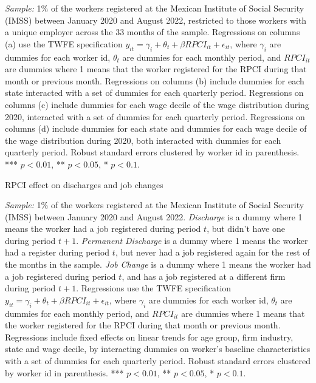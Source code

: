 \documentclass[oneside,11pt]{article}
\begin{document}
\scriptsize{
\noindent \textit{Sample:} 1\% of the workers registered at the Mexican Institute of Social Security (IMSS) between January 2020 and August 2022, restricted to those workers with a unique employer across the 33 months of the sample. Regressions on columns (a) use the TWFE specification $y_{it} = \gamma_{i} + \theta_{t}+ \beta RPCI_{it} +\epsilon_{it}$, where $\gamma_{i}$ are dummies for each worker id, $\theta_{t}$ are dummies for each monthly period, and $RPCI_{it}$ are dummies where 1 means that the worker registered for the RPCI during that month or previous month. Regressions on columns (b) include dummies for each state interacted with a set of dummies for each quarterly period. Regressions on columns (c) include dummies for each wage decile of the wage distribution during 2020, interacted with a set of dummies for each quarterly period. Regressions on columns (d) include dummies for each state and dummies for each wage decile of the wage distribution during 2020, both interacted with dummies for each quarterly period. Robust standard errors clustered by worker id in parenthesis. *** $p<0.01$, ** $p<0.05$, * $p<0.1$.
}


\clearpage

\begin{table}[H]
    \caption{RPCI effect on discharges and job changes}
    \label{twfe_job}
    \begin{center}
    \scriptsize{}
    \end{center}
\end{table}

\scriptsize{
\noindent \textit{Sample:} 1\% of the workers registered at the Mexican Institute of Social Security (IMSS) between January 2020 and August 2022. \textit{Discharge} is a dummy where 1 means the worker had a job registered during period $t$, but didn't have one during period $t+1$. \textit{Permanent Discharge} is a dummy where 1 means the worker had a register during period $t$, but never had a job registered again for the rest of the months in the sample. \textit{Job Change} is a dummy where 1 means the worker had a job registered during period $t$, and has a job registered at a different firm during period $t+1$. Regressions use the TWFE specification $y_{it} = \gamma_{i} + \theta_{t}+ \beta RPCI_{it} +\epsilon_{it}$, where $\gamma_{i}$ are dummies for each worker id, $\theta_{t}$ are dummies for each monthly period, and $RPCI_{it}$ are dummies where 1 means that the worker registered for the RPCI during that month or previous month. Regressions include fixed effects on linear trends for age group, firm industry, state and wage decile, by interacting dummies on worker's baseline characteristics with a set of dummies for each quarterly period. Robust standard errors clustered by worker id in parenthesis. *** $p<0.01$, ** $p<0.05$, * $p<0.1$.
}
\end{document}
